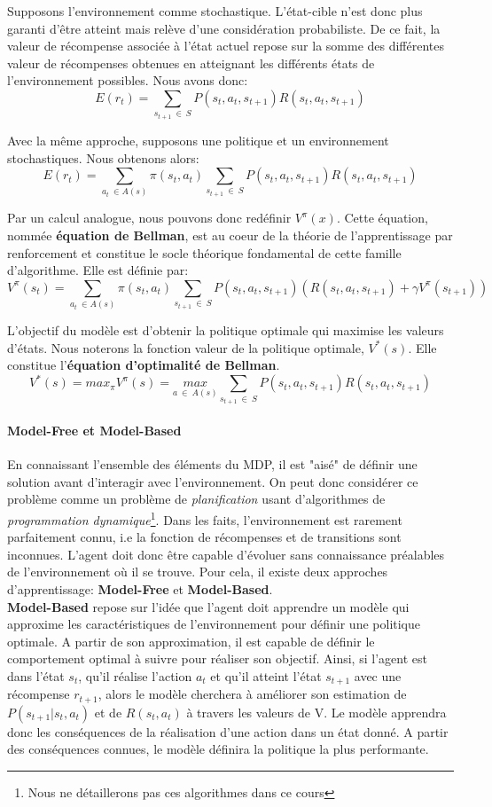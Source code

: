 \noindent Supposons l'environnement comme stochastique. L'état-cible n'est donc plus garanti d'être atteint mais relève d'une considération probabiliste. De ce fait, la valeur de récompense associée à l'état actuel repose sur la somme des différentes valeur de récompenses obtenues en atteignant les différents états de l'environnement possibles. Nous avons donc:
$$E(r_t)=\sum_{s_{t+1} \ \in \  S} P(s_t,a_t,s_{t+1})R(s_t,a_t,s_{t+1})$$

\noindent Avec la même approche, supposons une politique et un environnement stochastiques. Nous obtenons alors:
$$E(r_t)=\sum_{a_t \ \in A(s)} \pi(s_t,a_t) \sum_{s_{t+1} \ \in \  S} P(s_t,a_t,s_{t+1})R(s_t,a_t,s_{t+1})$$

\noindent Par un calcul analogue, nous pouvons donc redéfinir $V^\pi(x)$. Cette équation, nommée \textbf{équation de Bellman}, est au coeur de la théorie de l'apprentissage par renforcement et constitue le socle théorique fondamental de cette famille d'algorithme. Elle est définie par:
$$V^\pi(s_t)=\sum_{a_t \ \in A(s)} \pi(s_t,a_t) \sum_{s_{t+1} \ \in \  S} P(s_t,a_t,s_{t+1})(R(s_t,a_t,s_{t+1}) + \gamma V^\pi(s_{t+1}))$$

\noindent L'objectif du modèle est d'obtenir la politique optimale qui maximise les valeurs d'états. Nous noterons la fonction valeur de la politique optimale, $V^*(s)$. Elle constitue l'\textbf{équation d'optimalité de Bellman}.
$$V^*(s)=max_\pi V^\pi(s)=\underset{a \ \in \ A(s)}{max} \sum_{s_{t+1} \ \in \  S} P(s_t,a_t,s_{t+1})R(s_t,a_t,s_{t+1}) $$
\paragraph{Model-Free et Model-Based}
En connaissant l'ensemble des éléments du MDP, il est "aisé" de définir une solution avant d'interagir avec l'environnement. On peut donc considérer ce problème comme un problème de \textit{planification} usant d'algorithmes de \textit{programmation dynamique}\footnote{Nous ne détaillerons pas ces algorithmes dans ce cours}. Dans les faits, l'environnement est rarement parfaitement connu, i.e la fonction de récompenses et de transitions sont inconnues. L'agent doit donc être capable d'évoluer sans connaissance préalables de l'environnement où il se trouve. Pour cela, il existe deux approches d'apprentissage: \textbf{Model-Free} et \textbf{Model-Based}.\\

\noindent \textbf{Model-Based} repose sur l'idée que l'agent doit apprendre un modèle qui approxime les caractéristiques de l'environnement pour définir une politique optimale. A partir de son approximation, il est capable de définir le comportement optimal à suivre pour réaliser son objectif. Ainsi, si l'agent est dans l'état $s_t$, qu'il réalise l'action $a_t$ et qu'il atteint l'état $s_{t+1}$ avec une récompense $r_{t+1}$, alors le modèle cherchera à améliorer son estimation de $P(s_{t+1}|s_t,a_t)$ et de $R(s_t,a_t)$ à travers les valeurs de V. Le modèle apprendra donc les conséquences de la réalisation d'une action dans un état donné. A partir des conséquences connues, le modèle définira la politique la plus performante.\\

